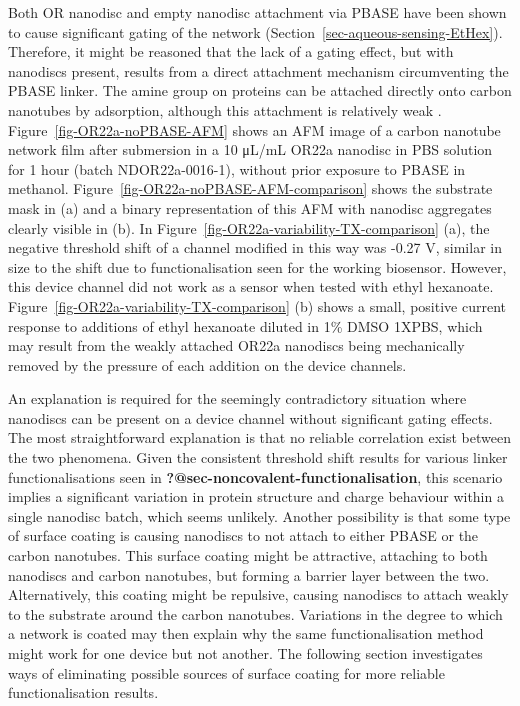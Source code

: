 \documentclass[
  a4paper,
]{scrbook}
\begin{document}
Both OR nanodisc and empty nanodisc attachment via PBASE have been shown
to cause significant gating of the network
(Section~\ref{sec-aqueous-sensing-EtHex}). Therefore, it might be
reasoned that the lack of a gating effect, but with nanodiscs present,
results from a direct attachment mechanism circumventing the PBASE
linker. The amine group on proteins can be attached directly onto carbon
nanotubes by adsorption, although this attachment is relatively weak
\autocite{Bradley2004}. Figure~\ref{fig-OR22a-noPBASE-AFM} shows an AFM
image of a carbon nanotube network film after submersion in a 10 μL/mL
OR22a nanodisc in PBS solution for 1 hour (batch NDOR22a-0016-1),
without prior exposure to PBASE in methanol.
Figure~\ref{fig-OR22a-noPBASE-AFM-comparison} shows the substrate mask
in (a) and a binary representation of this AFM with nanodisc aggregates
clearly visible in (b). In
Figure~\ref{fig-OR22a-variability-TX-comparison} (a), the negative
threshold shift of a channel modified in this way was -0.27 V, similar
in size to the shift due to functionalisation seen for the working
biosensor. However, this device channel did not work as a sensor when
tested with ethyl hexanoate.
Figure~\ref{fig-OR22a-variability-TX-comparison} (b) shows a small,
positive current response to additions of ethyl hexanoate diluted in 1\%
DMSO 1XPBS, which may result from the weakly attached OR22a nanodiscs
being mechanically removed by the pressure of each addition on the
device channels.

An explanation is required for the seemingly contradictory situation
where nanodiscs can be present on a device channel without significant
gating effects. The most straightforward explanation is that no reliable
correlation exist between the two phenomena. Given the consistent
threshold shift results for various linker functionalisations seen in
\textbf{?@sec-noncovalent-functionalisation}, this scenario implies a
significant variation in protein structure and charge behaviour within a
single nanodisc batch, which seems unlikely. Another possibility is that
some type of surface coating is causing nanodiscs to not attach to
either PBASE or the carbon nanotubes. This surface coating might be
attractive, attaching to both nanodiscs and carbon nanotubes, but
forming a barrier layer between the two. Alternatively, this coating
might be repulsive, causing nanodiscs to attach weakly to the substrate
around the carbon nanotubes. Variations in the degree to which a network
is coated may then explain why the same functionalisation method might
work for one device but not another. The following section investigates
ways of eliminating possible sources of surface coating for more
reliable functionalisation results.
\end{document}
